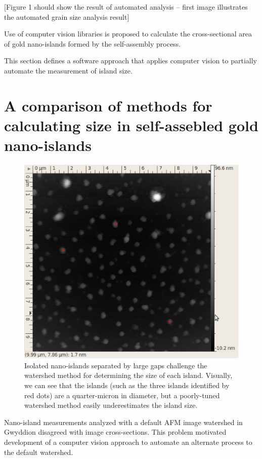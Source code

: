 \documentclass[12pt,oneside,english]{article}
\begin{document}
	[Figure 1 should show the result of automated analysis -- first image illustrates the automated grain size analysis result]

	Use of computer vision libraries is proposed to calculate the cross-sectional area of gold nano-islands formed by the self-assembly process.  
		
	This section defines a software approach that applies computer vision to partially automate the measurement of island size.


	\section{A comparison of methods for calculating size in self-assebled gold nano-islands}

	\begin{figure}
	\center
	\includegraphics[width=140mm]{images/gwyddion-original-spots.eps}
	\caption{Isolated nano-islands separated by large gaps challenge the watershed method for determining the size of each island.  Visually, we can see that the islands (such as the three islands identified by red dots) are a quarter-micron in diameter, but a poorly-tuned watershed method easily underestimates the island size.}
	\label{f:gwyOrig}
	\end{figure}
	
	Nano-island measurements analyzed with a default AFM image watershed in Gwyddion disagreed with image cross-sections.  
	This problem motivated development of a computer vision approach to automate an alternate process to the default watershed.
\end{document}
